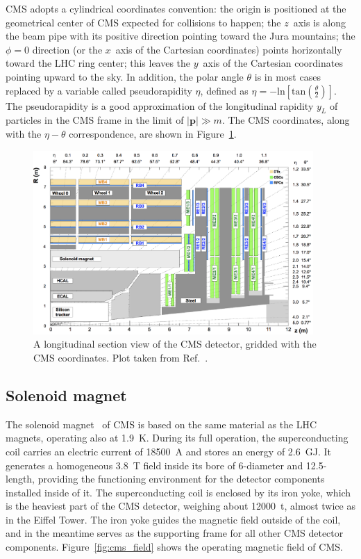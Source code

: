 CMS adopts a cylindrical coordinates convention: the origin is positioned at the geometrical center of CMS expected for collisions to happen;
the $z$~axis is along the beam pipe with its positive direction pointing toward the Jura mountains;
the $\phi = 0$ direction (or the $x$~axis of the Cartesian coordinates) points horizontally toward the LHC ring center;
this leaves the $y$~axis of the Cartesian coordinates pointing upward to the sky.
In addition, the polar angle $\theta$ is in most cases replaced by a variable called pseudorapidity $\eta$, 
defined as $\eta = -\text{ln}[\text{tan}(\frac{\theta}{2})]$.
The pseudorapidity is a good approximation of the longitudinal rapidity $y_{L}$ of particles in the CMS frame in the limit of $|\textbf{p}| \gg m$.
The CMS coordinates, along with the $\eta - \theta$ correspondence, are shown in Figure~\ref{fig:cms_longitudinal}.

\begin{figure}[!htb]
    \centering
    \captionsetup{justification=justified}
    \includegraphics[width=0.95\textwidth]{pics/LHC_CMS/CMS_longitudinal.png}
    \caption{A longitudinal section view of the CMS detector, gridded with the CMS coordinates.
             Plot taken from Ref.~\cite{Sirunyan_2018}.}
    \label{fig:cms_longitudinal}
\end{figure}


\subsection{Solenoid magnet}\label{sec:magnet}

The solenoid magnet~\cite{Collaboration_2008} of CMS is based on the same material as the LHC magnets, operating also at 1.9~K.
During its full operation, the superconducting coil carries an electric current of 18500~A and stores an energy of 2.6~GJ.
It generates a homogeneous 3.8~T field inside its bore of 6-\meter diameter and 12.5-\meter length,
providing the functioning environment for the detector components installed inside of it.
The superconducting coil is enclosed by its iron yoke, which is the heaviest part of the CMS detector, 
weighing about 12000~t, almost twice as in the Eiffel Tower.
The iron yoke guides the magnetic field outside of the coil, and in the meantime serves as the supporting frame for all other CMS detector components.
Figure~\ref{fig:cms_field} shows the operating magnetic field of CMS.

